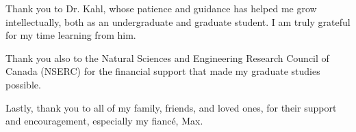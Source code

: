 Thank you to Dr. Kahl, whose patience and guidance has helped me grow intellectually, both as an undergraduate and graduate student. I am truly grateful for my time learning from him.

Thank you also to the Natural Sciences and Engineering Research Council of Canada (NSERC) for the financial support that made my graduate studies possible.

Lastly, thank you to all of my family, friends, and loved ones, for their support and encouragement, especially my fianc\'{e}, Max.
